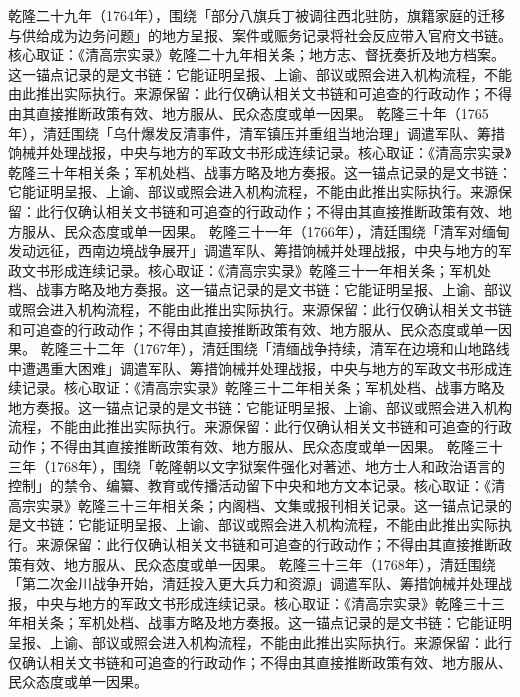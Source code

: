 乾隆二十九年（1764年），围绕「部分八旗兵丁被调往西北驻防，旗籍家庭的迁移与供给成为边务问题」的地方呈报、案件或赈务记录将社会反应带入官府文书链。核心取证：《清高宗实录》乾隆二十九年相关条；地方志、督抚奏折及地方档案。这一锚点记录的是文书链：它能证明呈报、上谕、部议或照会进入机构流程，不能由此推出实际执行。来源保留：此行仅确认相关文书链和可追查的行政动作；不得由其直接推断政策有效、地方服从、民众态度或单一因果。
乾隆三十年（1765年），清廷围绕「乌什爆发反清事件，清军镇压并重组当地治理」调遣军队、筹措饷械并处理战报，中央与地方的军政文书形成连续记录。核心取证：《清高宗实录》乾隆三十年相关条；军机处档、战事方略及地方奏报。这一锚点记录的是文书链：它能证明呈报、上谕、部议或照会进入机构流程，不能由此推出实际执行。来源保留：此行仅确认相关文书链和可追查的行政动作；不得由其直接推断政策有效、地方服从、民众态度或单一因果。
乾隆三十一年（1766年），清廷围绕「清军对缅甸发动远征，西南边境战争展开」调遣军队、筹措饷械并处理战报，中央与地方的军政文书形成连续记录。核心取证：《清高宗实录》乾隆三十一年相关条；军机处档、战事方略及地方奏报。这一锚点记录的是文书链：它能证明呈报、上谕、部议或照会进入机构流程，不能由此推出实际执行。来源保留：此行仅确认相关文书链和可追查的行政动作；不得由其直接推断政策有效、地方服从、民众态度或单一因果。
乾隆三十二年（1767年），清廷围绕「清缅战争持续，清军在边境和山地路线中遭遇重大困难」调遣军队、筹措饷械并处理战报，中央与地方的军政文书形成连续记录。核心取证：《清高宗实录》乾隆三十二年相关条；军机处档、战事方略及地方奏报。这一锚点记录的是文书链：它能证明呈报、上谕、部议或照会进入机构流程，不能由此推出实际执行。来源保留：此行仅确认相关文书链和可追查的行政动作；不得由其直接推断政策有效、地方服从、民众态度或单一因果。
乾隆三十三年（1768年），围绕「乾隆朝以文字狱案件强化对著述、地方士人和政治语言的控制」的禁令、编纂、教育或传播活动留下中央和地方文本记录。核心取证：《清高宗实录》乾隆三十三年相关条；内阁档、文集或报刊相关记录。这一锚点记录的是文书链：它能证明呈报、上谕、部议或照会进入机构流程，不能由此推出实际执行。来源保留：此行仅确认相关文书链和可追查的行政动作；不得由其直接推断政策有效、地方服从、民众态度或单一因果。
乾隆三十三年（1768年），清廷围绕「第二次金川战争开始，清廷投入更大兵力和资源」调遣军队、筹措饷械并处理战报，中央与地方的军政文书形成连续记录。核心取证：《清高宗实录》乾隆三十三年相关条；军机处档、战事方略及地方奏报。这一锚点记录的是文书链：它能证明呈报、上谕、部议或照会进入机构流程，不能由此推出实际执行。来源保留：此行仅确认相关文书链和可追查的行政动作；不得由其直接推断政策有效、地方服从、民众态度或单一因果。

